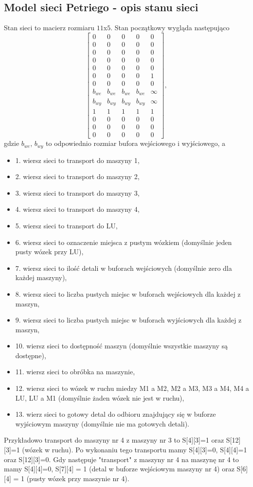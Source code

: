 \documentclass[10pt, a4paper]{article}
\begin{document}
\subsection{Model sieci Petriego - opis stanu sieci}
Stan sieci to macierz rozmiaru $11$x$ 5$. Stan początkowy wygląda następująco
\begin{equation}
\left[\begin{array}{ccccc}
0 & 0 & 0 & 0&0\\
0 &0 &0 &0&0\\
0 &0 &0 &0&0\\
0 &0 &0 &0&0\\
0 &0 &0 &0&0\\
0 &0 &0 &0 &1\\
0 &0 &0 &0&0\\
b_{we}&b_{we}&b_{we}&b_{we} & \infty\\
b_{wy}&b_{wy}&b_{wy}&b_{wy} & \infty\\
1&1&1&1 &1\\
0 &0 &0 &0 &0\\
0 &0 &0 &0 &0\\
0 &0 &0 &0 &0
\end{array}\right],
\end{equation}
gdzie $b_{we}$, $b_{wy}$ to odpowiednio rozmiar bufora wejściowego i wyjściowego, a
\begin{itemize}
\item 1. wiersz sieci to transport do maszyny 1,
\item 2. wiersz sieci to transport do maszyny 2,
\item 3. wiersz sieci to transport do maszyny 3,
\item 4. wiersz sieci to transport do maszyny 4,
\item 5. wiersz sieci to transport do LU,
\item 6. wiersz sieci to oznaczenie miejsca z pustym wózkiem (domyślnie jeden pusty wózek przy LU),
\item 7. wiersz sieci to ilość detali w buforach wejściowych (domyślnie zero dla każdej maszyny),
\item 8. wiersz sieci to liczba pustych miejsc w buforach wejściowych dla każdej z maszyn,
\item 9. wiersz sieci to liczba pustych miejsc w buforach wyjściowych dla każdej z maszyn,
\item 10. wiersz sieci to dostępność maszyn (domyślnie wszystkie maszyny są dostępne),
\item 11. wiersz sieci to obróbka na maszynie,
\item 12. wiersz sieci to wózek w ruchu miedzy M1 a M2, M2 a M3, M3 a M4, M4 a LU, LU a M1 (domyślnie żaden wózek nie jest w ruchu),
\item 13. wierz sieci to gotowy detal do odbioru znajdujący się w buforze wyjściowym maszyny (domyślnie nie ma gotowych detali).
\end{itemize}
Przykładowo transport do maszyny nr 4 z maszyny nr 3 to S[4][3]=1 oraz S[12][3]=1 (wózek w ruchu). Po wykonaniu tego transportu mamy S[4][3]=0, S[4][4]=1 oraz S[12][3]=0. Gdy następuje "transport" z maszyny nr 4 na maszynę nr 4 to mamy S[4][4]=0, S[7][4] = 1 (detal w buforze wejściowym maszyny nr 4) oraz S[6][4] = 1 (pusty wózek przy maszynie nr 4).
\end{document}
